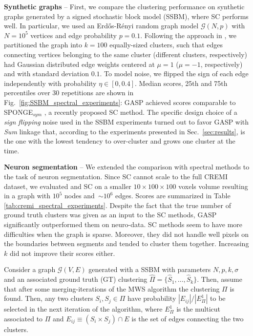 \textbf{Synthetic graphs} -- First, we compare the clustering performance on synthetic graphs generated by a signed stochastic block model (SSBM), where SC performs well. In particular, we used an Erd\H os-R\'enyi random graph model $\mathcal{G}(N,p)$ with $N=10^5$ vertices and edge probability $p=0.1$. Following the approach in \cite{Cucuringu2019SPONGEAG}, we partitioned the graph into $k=100$ equally-sized clusters, such that edges connecting vertices belonging to the same cluster (different clusters, respectively) had Gaussian distributed edge weights centered at $\mu=1$ ($\mu=-1$, respectively) and with standard deviation $0.1$. To model noise, we flipped the sign of each edge independently with probability $\eta \in [0, 0.4]$. Median scores, 25th and 75th percentiles over 30 repetitions are shown in Fig.~\ref{fig:SSBM_spectral_experiments}: GASP achieved scores comparable to SPONGE$_{sym}$ \cite{Cucuringu2019SPONGEAG}, a recently proposed SC method. The specific design choice of a \emph{sign flipping} noise used in the SSBM experiments turned out to favor GASP with \emph{Sum} linkage that, according to the experiments presented in Sec.~\ref{sec:results}, is the one with the lowest tendency to over-cluster and grows one cluster at the time.

\textbf{Neuron segmentation} -- We extended the comparison with spectral methods to the task of neuron segmentation. Since SC cannot scale to the full CREMI dataset, we evaluated \algname{} and SC on a smaller $10\times100\times100$ voxels volume resulting in a graph with $10^5$ nodes and~$\sim10^6$ edges. Scores are summarized in Table \ref{tab:cremi_spectral_experiments}.
Despite the fact that the true number of ground truth clusters was given as an input to the SC methods, GASP significantly outperformed them on neuro-data. SC methods seem to have more difficulties when the graph is sparse. Moreover, they did not handle well pixels on the boundaries between segments and tended to cluster them together. Increasing $k$ did not improve their scores either.





\begin{prop}\label{prop:MWS_SSBM_1}
Consider a graph $\mathcal{G}(V,E)$ generated with a SSBM with parameters $N,p,k,\sigma$ and an associated ground truth (GT) clustering $\hat{\Pi}=\{\hat{S}_1, \ldots, \hat{S}_k\}$. Then, assume that after some merging-iterations of the MWS algorithm the clustering $\Pi$ is found. Then, any two clusters $S_i,S_j\in \Pi$ have probability $|E_{ij}| / |E_{\Pi}^1|$ to be selected in the next iteration of the algorithm, where $E_{\Pi}^1$ is the multicut associated to $\Pi$ and $E_{ij}\equiv(S_i\times S_j)\cap E$ is the set of edges connecting the two clusters. 
\end{prop}

